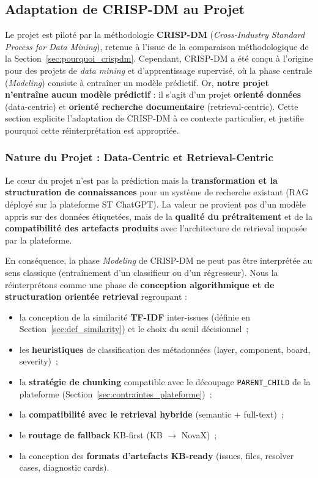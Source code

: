 \documentclass[12pt,a4paper]{report}
\begin{document}
\subsection{Adaptation de CRISP-DM au Projet}
\label{sec:crispdm_adaptation}

Le projet est piloté par la méthodologie \textbf{CRISP-DM} (\textit{Cross-Industry Standard Process for Data Mining}), retenue à l'issue de la comparaison méthodologique de la Section~\ref{sec:pourquoi_crispdm}. Cependant, CRISP-DM a été conçu à l'origine pour des projets de \textit{data mining} et d'apprentissage supervisé, où la phase centrale (\textit{Modeling}) consiste à entraîner un modèle prédictif. Or, \textbf{notre projet n'entraîne aucun modèle prédictif} : il s'agit d'un projet \textbf{orienté données} (data-centric) et \textbf{orienté recherche documentaire} (retrieval-centric). Cette section explicite l'adaptation de CRISP-DM à ce contexte particulier, et justifie pourquoi cette réinterprétation est appropriée.

\subsubsection{Nature du Projet : Data-Centric et Retrieval-Centric}
\label{sec:crispdm_nature}

Le c\oe ur du projet n'est pas la prédiction mais la \textbf{transformation et la structuration de connaissances} pour un système de recherche existant (RAG déployé sur la plateforme ST ChatGPT). La valeur ne provient pas d'un modèle appris sur des données étiquetées, mais de la \textbf{qualité du prétraitement} et de la \textbf{compatibilité des artefacts produits} avec l'architecture de retrieval imposée par la plateforme.

En conséquence, la phase \textit{Modeling} de CRISP-DM ne peut pas être interprétée au sens classique (entraînement d'un classifieur ou d'un régresseur). Nous la réinterprétons comme une phase de \textbf{conception algorithmique et de structuration orientée retrieval} regroupant :
\begin{itemize}
  \item la conception de la similarité \textbf{TF-IDF} inter-issues (définie en Section~\ref{sec:def_similarity}) et le choix du seuil décisionnel~;
  \item les \textbf{heuristiques} de classification des métadonnées (layer, component, board, severity)~;
  \item la \textbf{stratégie de chunking} compatible avec le découpage \texttt{PARENT\_CHILD} de la plateforme (Section~\ref{sec:contraintes_plateforme})~;
  \item la \textbf{compatibilité avec le retrieval hybride} (semantic + full-text)~;
  \item le \textbf{routage de fallback} KB-first (KB $\to$ NovaX)~;
  \item la conception des \textbf{formats d'artefacts KB-ready} (issues, files, resolver cases, diagnostic cards).
\end{itemize}
\end{document}
